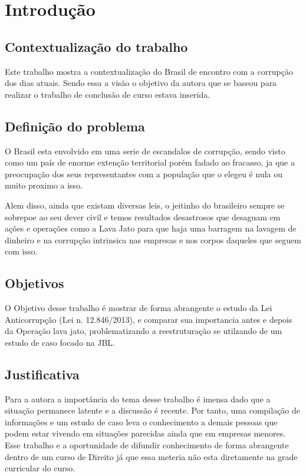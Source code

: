 \chapter[Introdução]{Introdução}
\label{chap:introducao}
\section{Contextualização do trabalho}
\label{cha:contexto}

Este trabalho mostra a contextualização do Brasil de encontro com a corrupção dos dias atuais. Sendo essa a visão o objetivo da autora que se baseou para realizar o trabalho de conclusão de curso estava inserida. 

\section{Definição do problema}
\label{cha:definição_do_problema}
O Brasil esta envolvido em uma serie de escandalos de corrupção, sendo visto como um país de enorme extenção territorial porém fadado ao fracasso, ja que a preocupação dos seus representantes com a população que o elegeu é nula ou muito proximo a isso. 

Alem disso, ainda que existam diversas leis, o jeitinho do brasileiro sempre se sobrepoe ao seu dever civil e temos resultados desastrosos que desaguam em ações e operações como a Lava Jato para que haja uma barragem na lavagem de dinheiro e na corrupção intrinsica nas empresas e nos corpos daqueles que seguem com isso. 


\section[Objetivos]{Objetivos}
\label{chap:objetivos}
O Objetivo desse trabalho é mostrar de forma abrangente o estudo da Lei Anticorrupção (Lei n. 12.846/2013), e comparar sua importancia antes e depois da Operação lava jato, problematizando a reestruturação se utilzando de um estudo de caso focado na JBL. 

\section{Justificativa}
\label{cha:justificativa}
Para a autora a importância do tema desse trabalho é imensa dado que a situação permanece latente e a discussão é recente. Por tanto, uma compilação de informações e um estudo de caso leva o conhecimento a demais pessoas que podem estar vivendo em situações parecidas ainda que em empresas menores. Esse trabalho e a oportunidade de difundir conhecimento de forma abrangente dentro de um curso de Direito já que essa meteria não esta diretamente na grade curricular do curso. 

